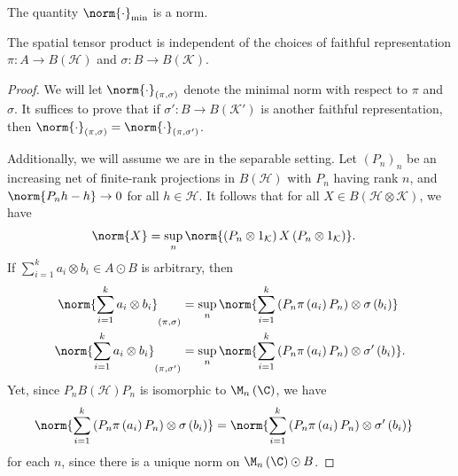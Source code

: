 \documentclass[10pt]{mypackage}
\begin{document}
\begin{corollary}
  The quantity $\norm{\cdot}_{\min}$ is a norm.
\end{corollary}
\begin{proposition}
  The spatial tensor product is independent of the choices of faithful representation $\pi\colon A\rightarrow B\left( \mathcal{H} \right)$ and $\sigma\colon B\rightarrow B\left( \mathcal{K} \right)$.
\end{proposition}
\begin{proof}
  We will let $\norm{\cdot}_{\left( \pi,\sigma \right)}$ denote the minimal norm with respect to $\pi$ and $\sigma$. It suffices to prove that if $\sigma'\colon B\rightarrow B\left( \mathcal{K}' \right)$ is another faithful representation, then $\norm{\cdot}_{\left( \pi,\sigma \right)} = \norm{\cdot}_{\left( \pi,\sigma' \right)}$.

  Additionally, we will assume we are in the separable setting. Let $\left( P_n \right)_n$ be an increasing net of finite-rank projections in $B\left( \mathcal{H} \right)$ with $P_n$ having rank $n$, and $\norm{P_nh-h}\rightarrow 0$ for all $h\in \mathcal{H}$. It follows that for all $X\in B\left( \mathcal{H}\otimes \mathcal{K} \right)$, we have
  \begin{align*}
    \norm{X} &= \sup_{n} \norm{\left( P_n\otimes 1_{\mathcal{K}} \right)X\left( P_n\otimes 1_{\mathcal{K}} \right)}.
  \end{align*}
  If $\sum_{i=1}^{k}a_i\otimes b_i\in A\odot B$ is arbitrary, then
  \begin{align*}
    \norm{\sum_{i=1}^{k}a_i\otimes b_i}_{\left( \pi,\sigma \right)} &= \sup_{n} \norm{\sum_{i=1}^{k}\left( P_n\pi\left( a_i \right)P_n \right)\otimes \sigma\left( b_i \right)}\\
    \norm{\sum_{i=1}^{k}a_i\otimes b_i}_{\left( \pi,\sigma' \right)} &= \sup_{n} \norm{\sum_{i=1}^{k}\left( P_n\pi\left( a_i \right)P_n \right)\otimes \sigma'\left( b_i \right)}.
  \end{align*}
  Yet, since $P_nB\left( \mathcal{H} \right)P_n$ is isomorphic to $\M_n\left( \C \right)$, we have
  \begin{align*}
    \norm{\sum_{i=1}^{k}\left( P_n\pi\left( a_i \right)P_n \right)\otimes \sigma\left( b_i \right)} &= \norm{\sum_{i=1}^{k}\left( P_n\pi\left( a_i \right)P_n \right)\otimes \sigma'\left( b_i \right)}
  \end{align*}
  for each $n$, since there is a unique norm on $\M_n\left( \C \right)\odot B$.
\end{proof}
\end{document}
